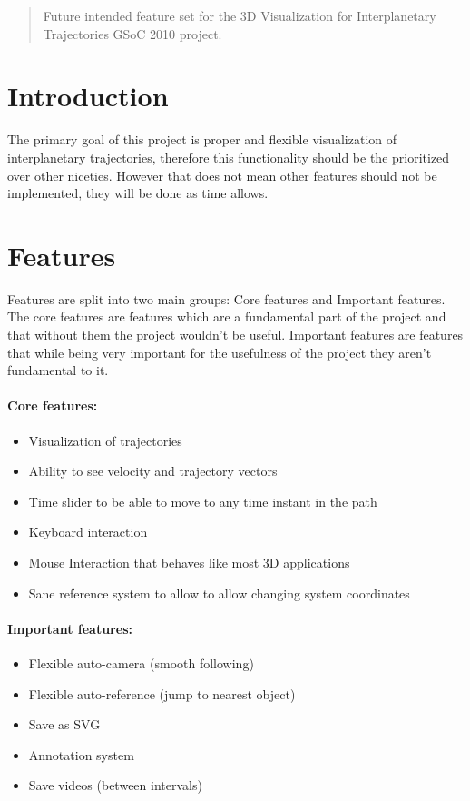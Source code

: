\documentclass[12pt]{article}
\begin{document}
\maketitle

\begin{abstract}
Future intended feature set for the 3D Visualization for Interplanetary Trajectories GSoC 2010 project.
\end{abstract}

\section{Introduction}
The primary goal of this project is proper and flexible visualization of interplanetary trajectories, therefore this functionality should be the prioritized over other niceties. However that does not mean other features should not be implemented, they will be done as time allows.

\section{Features}

Features are split into two main groups: Core features and Important features. The core features are features which are a fundamental part of the project and that without them the project wouldn't be useful. Important features are features that while being very important for the usefulness of the project they aren't fundamental to it.

\paragraph{Core features:}
\begin{itemize}
\item Visualization of trajectories
\item Ability to see velocity and trajectory vectors
\item Time slider to be able to move to any time instant in the path
\item Keyboard interaction
\item Mouse Interaction that behaves like most 3D applications
\item Sane reference system to allow to allow changing system coordinates
\end{itemize}

\paragraph{Important features:}
\begin{itemize}
\item Flexible auto-camera (smooth following)
\item Flexible auto-reference (jump to nearest object)
\item Save as SVG
\item Annotation system
\item Save videos (between intervals)
\end{itemize}
\end{document}
